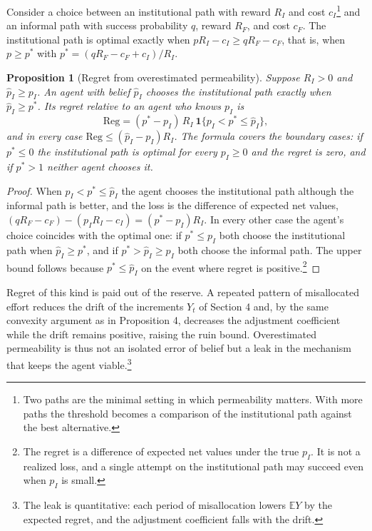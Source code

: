 \documentclass[11pt]{article}
\newtheorem{proposition}{Proposition}
\theoremstyle{remark}
\newcommand{\E}{\mathbb{E}}
\begin{document}
Consider a choice between an institutional path with reward $R_I$ and cost $c_I$\footnote{Two paths are the minimal setting in which permeability matters. With more paths the threshold becomes a comparison of the institutional path against the best alternative.} and an informal path with success probability $q$, reward $R_F$, and cost $c_F$. The institutional path is optimal exactly when $pR_I-c_I\ge qR_F-c_F$, that is, when $p\ge p^\ast$ with $p^\ast=(qR_F-c_F+c_I)/R_I$.

\begin{proposition}[Regret from overestimated permeability]
Suppose $R_I>0$ and $\hat p_I\ge p_I$. An agent with belief $\hat p_I$ chooses the institutional path exactly when $\hat p_I\ge p^\ast$. Its regret relative to an agent who knows $p_I$ is
\[
\mathrm{Reg}=(p^\ast-p_I)\,R_I\ \mathbf 1\{p_I<p^\ast\le\hat p_I\},
\]
and in every case $\mathrm{Reg}\le(\hat p_I-p_I)R_I$. The formula covers the boundary cases: if $p^\ast\le0$ the institutional path is optimal for every $p_I\ge0$ and the regret is zero, and if $p^\ast>1$ neither agent chooses it.
\end{proposition}

\begin{proof}
When $p_I<p^\ast\le\hat p_I$ the agent chooses the institutional path although the informal path is better, and the loss is the difference of expected net values, $(qR_F-c_F)-(p_IR_I-c_I)=(p^\ast-p_I)R_I$. In every other case the agent's choice coincides with the optimal one: if $p^\ast\le p_I$ both choose the institutional path when $\hat p_I\ge p^\ast$, and if $p^\ast>\hat p_I\ge p_I$ both choose the informal path. The upper bound follows because $p^\ast\le\hat p_I$ on the event where regret is positive.\footnote{The regret is a difference of expected net values under the true $p_I$. It is not a realized loss, and a single attempt on the institutional path may succeed even when $p_I$ is small.}
\end{proof}

Regret of this kind is paid out of the reserve. A repeated pattern of misallocated effort reduces the drift of the increments $Y_t$ of Section 4 and, by the same convexity argument as in Proposition 4, decreases the adjustment coefficient while the drift remains positive, raising the ruin bound. Overestimated permeability is thus not an isolated error of belief but a leak in the mechanism that keeps the agent viable.\footnote{The leak is quantitative: each period of misallocation lowers $\E Y$ by the expected regret, and the adjustment coefficient falls with the drift.}
\end{document}
